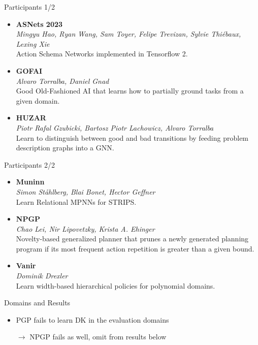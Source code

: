 \documentclass[aspectratio=169,xcolor=dvipsnames]{beamer}
\begin{document}
\begin{frame}{Participants 1/2}
\begin{itemize}
\item
    \textbf{ASNets 2023}\\
    \emph{Mingyu Hao, Ryan Wang, Sam Toyer, Felipe Trevizan, Sylvie
    Thiébaux, Lexing Xie}\\
    Action Schema Networks implemented in Tensorflow 2.
\item
    \textbf{GOFAI}\\
    \emph{Alvaro Torralba, Daniel Gnad}\\
    Good Old-Fashioned AI that learns
    how to partially ground tasks from a given domain.
\item
    \textbf{HUZAR}\\
    \emph{Piotr Rafal Gzubicki, Bartosz Piotr Lachowicz, Alvaro Torralba}\\
    Learn to distinguish between good and bad transitions by feeding
    problem description graphs into a GNN.
\end{itemize}
\end{frame}

\begin{frame}{Participants 2/2}
\begin{itemize}
\item
    \textbf{Muninn}\\
    \emph{Simon Ståhlberg, Blai Bonet, Hector Geffner}\\
    Learn Relational MPNNs for STRIPS.
\item
    \textbf{NPGP}\\
    \emph{Chao Lei, Nir Lipovetzky, Krista A. Ehinger}\\
    Novelty-based generalized planner that
    prunes a newly generated planning program if its most frequent action
    repetition is greater than a given bound.
\item
    \textbf{Vanir}\\
    \emph{Dominik Drexler}\\
    Learn width-based hierarchical policies for
    polynomial domains.
\end{itemize}
\end{frame}

\begin{frame}{Domains and Results}
  \begin{itemize}
    \item PGP fails to learn DK in the evaluation domains
    \item[$\to$] NPGP fails as well, omit from results below
  \end{itemize}

\end{frame}
\end{document}
